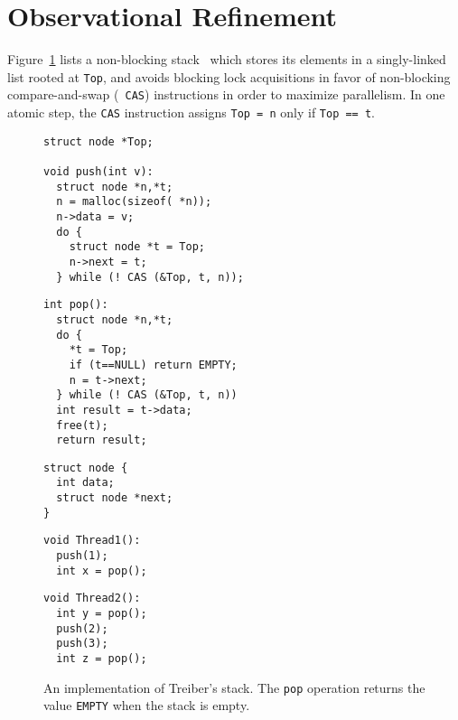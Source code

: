 
\section{Observational Refinement}
\label{sec:refinement}


Figure~\ref{fig:treiber} lists a non-blocking stack~\cite{tr/Treiber86} which
stores its elements in a singly-linked list rooted at {\tt Top}, and avoids
blocking lock acquisitions in favor of non-blocking compare-and-swap ({\tt
CAS}) instructions in order to maximize parallelism. In one atomic step, the
{\tt CAS} instruction assigns {\tt Top = n} only if {\tt Top == t}.

\begin{figure}[t]
  \scriptsize
  \begin{minipage}[t]{41mm}
    \begin{verbatim}
struct node *Top;      
      
void push(int v):
  struct node *n,*t;
  n = malloc(sizeof( *n));
  n->data = v;
  do {
    struct node *t = Top;
    n->next = t;
  } while (! CAS (&Top, t, n));
    \end{verbatim}
  \end{minipage}
  \begin{minipage}[t]{40mm}
    \begin{verbatim}
int pop():
  struct node *n,*t;
  do {
    *t = Top;
    if (t==NULL) return EMPTY;
    n = t->next;
  } while (! CAS (&Top, t, n))
  int result = t->data;
  free(t);
  return result;
    \end{verbatim}
  \end{minipage}
  \begin{minipage}[t]{30mm}
    \begin{verbatim}
struct node {
  int data;
  struct node *next;
}
    \end{verbatim}
  \end{minipage}
  \begin{minipage}[t]{25mm}
    \begin{verbatim}
void Thread1():
  push(1);
  int x = pop();
    \end{verbatim}
  \end{minipage}
  \begin{minipage}[t]{25mm}
    \begin{verbatim}
void Thread2():
  int y = pop();
  push(2);
  push(3);
  int z = pop();
    \end{verbatim}
  \end{minipage}
  \caption{An implementation of Treiber's stack. The {\tt pop} operation
  returns the value {\tt EMPTY} when the stack is empty.}
  \label{fig:treiber}
\end{figure}

